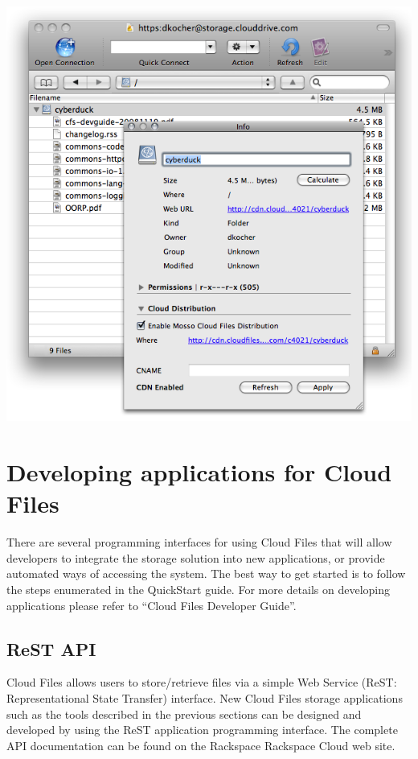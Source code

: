 \documentclass[letterpaper,10pt,english]{manual}
\begin{document}
{\hfill\includegraphics{cyberduck.png}\hfill}


\chapter{Developing applications for Cloud Files}

There are several programming interfaces for using Cloud Files that will
allow developers to integrate the storage solution into new applications,
or provide automated ways of accessing the system. The best way to get
started is to follow the steps enumerated in the QuickStart guide. For
more details on developing applications please refer to “Cloud Files
Developer Guide”.


\section{ReST API}

Cloud Files allows users to store/retrieve files via a simple Web Service
(ReST: Representational State Transfer) interface. New Cloud Files storage
applications such as the tools described in the previous sections can be
designed and developed by using the ReST application programming
interface. The complete API documentation can be found on the Rackspace
Rackspace Cloud web site.
\end{document}
